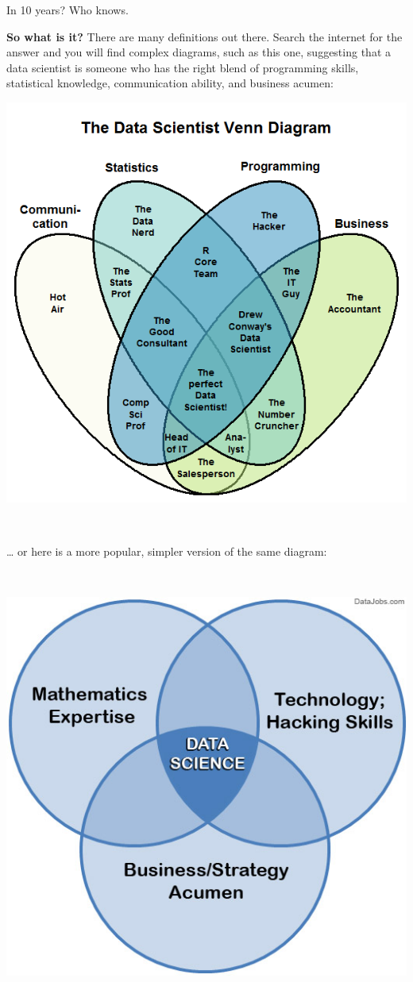 \documentclass[
]{book}
\begin{document}
In 10 years? Who knows.

\textbf{So what is it?} There are many definitions out there. Search the internet for the answer and you will find complex diagrams, such as this one, suggesting that a data scientist is someone who has the right blend of programming skills, statistical knowledge, communication ability, and business acumen:

\includegraphics{img/venn1.png}

~

\ldots{} or here is a more popular, simpler version of the same diagram:

~

\includegraphics{img/venn5.jpg}
\end{document}
